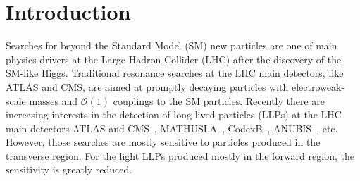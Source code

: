 \documentclass[letterpaper,11pt]{article}
\begin{document}
\section{Introduction} 
Searches for beyond the Standard Model (SM) new particles are one of main physics drivers at the Large Hadron Collider (LHC) after the discovery of the SM-like Higgs. Traditional resonance searches at the LHC main detectors, like ATLAS and CMS, are aimed at promptly decaying particles with electroweak-scale masses and $\mathcal{O}(1)$ couplings to the SM particles. Recently there are increasing  interests in the detection of long-lived particles (LLPs) at the LHC main detectors ATLAS and CMS~\cite{Gershtein:2017tsv, Liu:2018wte, Lee:2018pag, Alimena:2019zri, Liu:2019ayx, Liu:2020vur, Gershtein:2020mwi, Chiu:2021sgs, Fischer:2021sqw, Bose:2022obr, ATLAS:2022pib, ATLAS:2022cob, CMS:2016ybj, CMS:2015pca, CMS:2022qej, ATLAS:2018rjc, CMS:2017kku, ATLAS:2022zhj, CMS:2020iwv, ATLAS:2021mdj, CMS:2019zxa, CMS:2019qjk, ATLAS:2019qrr, CMS:2021sch, ATLAS:2022vyq, ATLAS:2022gvp}, MATHUSLA~\cite{Chou:2016lxi, Curtin:2017izq, Evans:2017lvd, Curtin:2018mvb, Curtin:2018ees, Berlin:2018jbm, MATHUSLA:2018bqv,  MATHUSLA:2019qpy, Alimena:2019zri, Jodlowski:2019ycu, Alidra:2020thg, MATHUSLA:2020uve, MATHUSLA:2022sze, Bose:2022obr}, CodexB~\cite{Gligorov:2017nwh, Dey:2019vyo, Aielli:2019ivi, Aielli:2022awh}, ANUBIS~\cite{Bauer:2019vqk, Hirsch:2020klk, Dreiner:2020qbi}, etc.  However, those searches are mostly sensitive to particles produced in the transverse region. For the light  LLPs produced mostly in the forward region, the sensitivity is greatly reduced.
 
\end{document}

